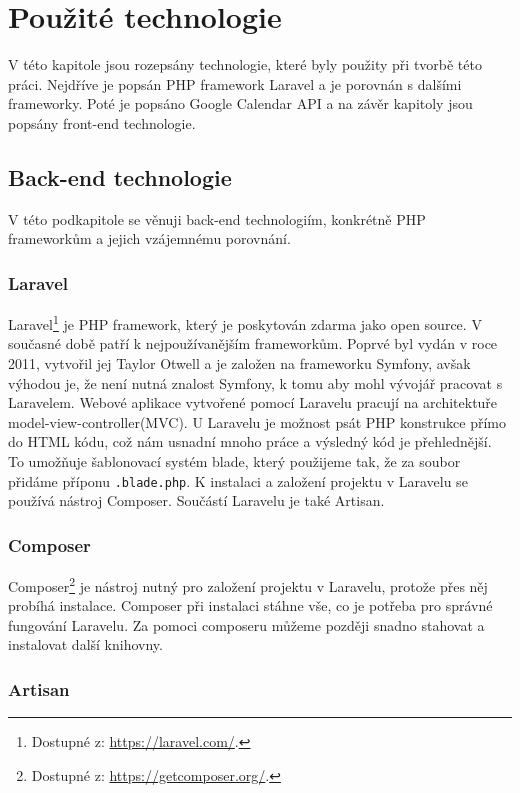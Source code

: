 \chapter{Použité technologie}
\label{technologies}

V této kapitole jsou rozepsány technologie, které byly použity při tvorbě této práci. Nejdříve je popsán PHP framework Laravel a je porovnán s dalšími frameworky. Poté je popsáno Google Calendar API a na závěr kapitoly jsou popsány front-end technologie.

\section{Back-end technologie}

V této podkapitole se věnuji back-end technologiím, konkrétně PHP frameworkům a jejich vzájemnému porovnání.

\subsection{Laravel}

Laravel\footnote{Dostupné z: \url{https://laravel.com/}.} je PHP framework, který je poskytován zdarma jako open source. V současné době patří k nejpoužívanějším frameworkům. Poprvé byl vydán v roce 2011, vytvořil jej Taylor Otwell a je založen na frameworku Symfony, avšak výhodou je, že není nutná znalost Symfony, k tomu aby  mohl vývojář pracovat s Laravelem. Webové aplikace vytvořené pomocí Laravelu pracují na architektuře model-view-controller(MVC). \cite{laravel} U Laravelu je možnost psát PHP konstrukce přímo do HTML kódu, což nám usnadní mnoho práce a výsledný kód je přehlednější. To umožňuje šablonovací systém blade, který použijeme tak, že za soubor přidáme příponu \texttt{.blade.php}. K instalaci a založení projektu v Laravelu se používá nástroj Composer. Součástí Laravelu je také Artisan.

\subsection*{Composer}

Composer\footnote{Dostupné z: \url{https://getcomposer.org/}.} je nástroj nutný pro založení projektu v Laravelu, protože přes něj probíhá instalace. Composer při instalaci stáhne vše, co je potřeba pro správné fungování Laravelu. Za pomoci composeru můžeme později snadno stahovat a instalovat další knihovny. \cite{composer}

\subsection*{Artisan}

